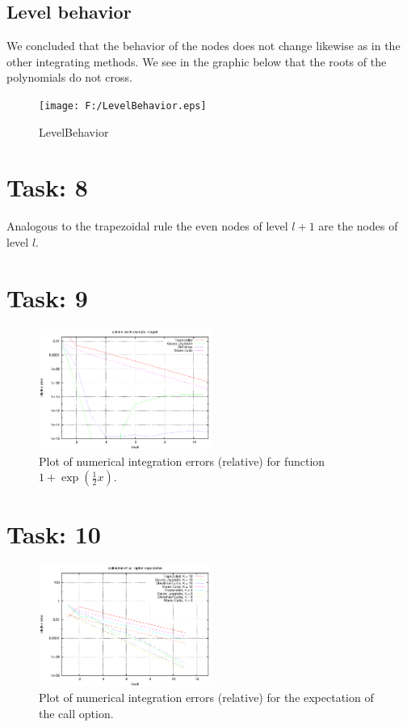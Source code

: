 \documentclass{article}
\begin{document}
\subsection*{Level behavior}
We concluded that the behavior of the nodes does not change likewise as in the other integrating methods. We see in the graphic below that the roots of the polynomials do not cross.
\begin{figure}[htbp]
  \centering
    \texttt{[image: F:/LevelBehavior.eps]}
  \caption{LevelBehavior}
  \label{fig:LevelBehavior}
\end{figure}

\section*{Task: 8}

Analogous to the trapezoidal rule the even nodes of level $l+1$ are the nodes of level $l$.

\section*{Task: 9}

\begin{figure}[htbp]
  \centering
    \includegraphics[width=0.50\textwidth]{../Task09/task9_convergence_plot.eps}
  \caption{Plot of numerical integration errors (relative) for function $1+\exp\left(\frac{1}{2}x\right)$.}
\end{figure}

\section*{Task: 10}

\begin{figure}[htbp]
  \centering
    \includegraphics[width=0.50\textwidth]{../Task10/task10_convergence_plot.eps}
  \caption{Plot of numerical integration errors (relative) for the expectation of the call option.}
\end{figure}
\end{document}

